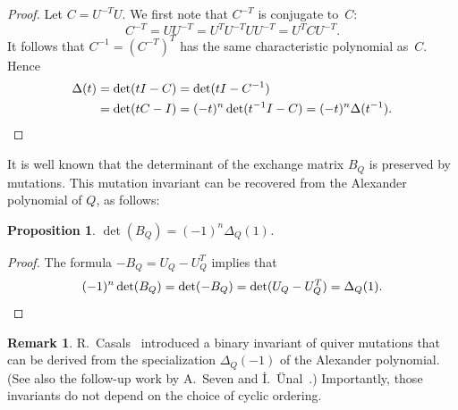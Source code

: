 \documentclass[11pt, letterpaper]{amsart}
\newtheorem{proposition}[theorem]{Proposition}
\theoremstyle{definition}
\newtheorem{remark}[theorem]{Remark}
\numberwithin{equation}{section}
\begin{document}
\begin{proof}
Let $C = U^{-T} U$.
We first note that $C^{-T}$ is conjugate to~$C$:
\begin{equation*}
C^{-T}=U U^{-T} = U^T U^{-T} U U^{-T} = U^T C U^{-T}. 
\end{equation*}
It follows that $C^{-1}=(C^{-T})^T$ has the same characteristic polynomial as~$C$.  
Hence
\begin{align*}
\Delta(t) &= \det(tI-C) = \det(tI-C^{-1}) \\
&= \det(tC-I) = (-t)^n \det(t^{-1}I-C) = (-t)^n \Delta(t^{-1}). \qedhere
\end{align*}
\end{proof}


It is well known \cite[Theorem 2.8.4]{fwz1-3} that the determinant of the exchange matrix $B_Q$
is preserved by mutations. 
This mutation invariant can be recovered from the Alexander polynomial of $Q$, as follows: 

\begin{proposition} 
 $\det(B_Q)=(-1)^n\Delta_Q(1)$.  
\end{proposition}

\begin{proof}
 The formula $-B_Q = U_Q-U_Q^T$ implies that 
\begin{equation*}
 (-1)^n\det(B_Q) =\det(-B_Q) =\det(U_Q-U_Q^{T}) = \Delta_Q(1).\qedhere
\end{equation*}
 \end{proof}
 
\begin{remark}
\label{rem:casals}
R.~Casals~\cite{casals-binary} introduced a binary invariant of quiver mutations that 
can be derived from the specialization $\Delta_Q(-1)$ of the Alexander polynomial. 
(See also the follow-up work by A.~Seven and \.I.~\"Unal~\cite{Seven-congruence}.) 
Importantly, those invariants do not depend on the choice of cyclic ordering.  
\end{remark}

\end{document}
